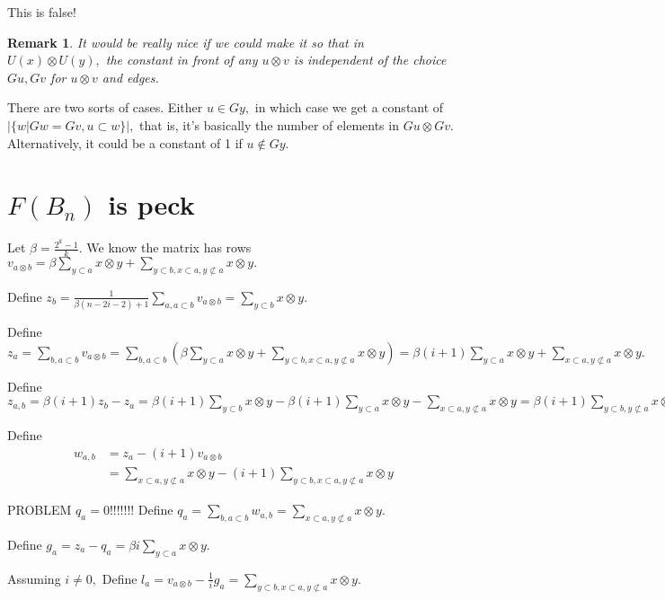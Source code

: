 \documentclass{amsart}
\newtheorem{rem}[subsubsection]{Remark}
\begin{document}
This is false!

\begin{rem}
It would be really nice if we could make it so that in $U(x) \otimes U(y),$ the constant in front of any $u \otimes v$ is independent of the choice $Gu,Gv$ for $u \otimes v$ and edges.
\end{rem}

There are two sorts of cases. Either $u  \in Gy,$ in which case we get a constant of $|\{w | Gw = Gv,u \subset w\}|,$ that is, it's basically the number of elements in $Gu \otimes Gv.$ Alternatively, it could be a constant of 1 if $u \notin Gy.$


\section{$F(B_n)$ is peck}
Let $\beta = \frac{2^k-1}{k}.$
We know the matrix has rows $v_{a \otimes b} =\beta \sum_{y \subset a}^{}x \otimes y + \sum_{y\subset b,x \subset a,y\not\subset a}^{}x\otimes y.$

Define $z_b =\frac{1}{\beta(n-2i-2)+1} \sum_{a,a\subset b}^{}v_{a\otimes b}= \sum_{y\subset b}^{}x\otimes y.$

Define $z_a = \sum_{b,a\subset b}^{}v_{a \otimes b} = \sum_{b,a\subset b}^{}(\beta \sum_{y\subset a}^{}x\otimes y + \sum_{y\subset b, x \subset a,y\not\subset a}^{}x \otimes y)= \beta (i+1) \sum_{y\subset a}^{}x\otimes y+ \sum_{x\subset a,y\not\subset a}^{}x\otimes y.$

Define $z_{a,b} = \beta (i+1) z_b - z_a =\beta (i+1) \sum_{y\subset b}^{}x\otimes y - \beta (i+1) \sum_{y\subset a}^{}x\otimes y - \sum_{x\subset a,y\not\subset a}^{}x\otimes y
=
\beta (i+1) \sum_{y\subset b,y\not\subset a}^{}x\otimes y - \sum_{x\subset a,y\not\subset a}^{}x\otimes y.$

Define
\begin{align*}
w_{a,b} &= z_a - (i+1)v_{a\otimes b}\\
&= \sum_{x\subset a,y\not\subset a}^{}x\otimes y - (i+1) \sum_{y\subset b,x\subset a,y\not\subset a}^{}x\otimes y
\end{align*}

PROBLEM $q_a = 0$!!!!!!!
Define $q_a = \sum_{b,a\subset b}^{}w_{a,b} = \sum_{x\subset a,y\not \subset a}^{}x\otimes y.$

Define $g_a = z_a - q_a = \beta i \sum_{y\subset a}^{}x\otimes y.$

Assuming $i \neq 0,$
Define $l_a = v_{a\otimes b} - \frac{1}{i}g_a = \sum_{y\subset b,x\subset a,y\not\subset a}^{}x\otimes y.$
\end{document}
